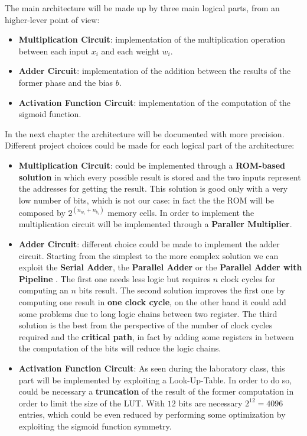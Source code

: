 The main architecture will be made up by three main logical parts, from an higher-lever point of view:
\begin{itemize}
	\item \textbf{Multiplication Circuit}: implementation of the multiplication operation between each input $x_{i}$ and each weight $w_{i}$.
	\item \textbf{Adder Circuit}: implementation of the addition between the results of the former phase and the bias $b$.
	\item \textbf{Activation Function Circuit}: implementation of the computation of the sigmoid function.
\end{itemize}

In the next chapter the architecture will be documented with more precision.
Different project choices could be made for each logical part of the architecture:

\begin{itemize}
	\item{\textbf{Multiplication Circuit}}: could be implemented through a \textbf{ROM-based solution} in which every possible result is stored and the two inputs represent the addresses for getting the result. This solution is good only with a very low number of bits, which is not our case: in fact the the ROM will be composed by $2^{(n_{w_{i}} + n_{b_{i}})}$ memory cells. In order to implement the multiplication circuit will be implemented through a  \textbf{Paraller Multiplier}.
	\item{\textbf{Adder Circuit}}: different choice could be made to implement the adder circuit. Starting from the simplest to the more complex solution we can exploit the \textbf{Serial Adder}, the \textbf{Parallel Adder} or the \textbf{Parallel Adder with Pipeline }. The first one needs less logic but requires $n$ clock cycles for computing an $n$ bits result. The second solution improves the first one by computing one result in \textbf{one clock cycle}, on the other hand it could add some problems due to long logic chains between two register. The third solution is the best from the perspective of the number of clock cycles required and the \textbf{critical path}, in fact by adding some registers in between the computation of the bits will reduce the logic chains. 
	\item{\textbf{Activation Function Circuit}}: As seen during the laboratory class, this part will be implemented by exploiting a Look-Up-Table. In order to do so, could be necessary a \textbf{truncation} of the result of the former computation in order to limit the size of the LUT. With $12$ bits are necessary $2^{12} = 4096$ entries, which could be even reduced by performing some optimization by exploiting the sigmoid function symmetry.
\end{itemize} 
